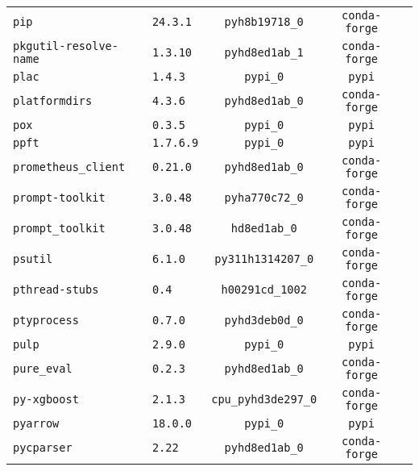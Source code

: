 \begin{longtable}{p{}|l|ccc}
\texttt{pip}                       & \texttt{24.3.1}             & \texttt{pyh8b19718\_0}    & \texttt{conda-forge}\\
\texttt{pkgutil-resolve-name}      & \texttt{1.3.10}             & \texttt{pyhd8ed1ab\_1}    & \texttt{conda-forge}\\
\texttt{plac}                      & \texttt{1.4.3}              & \texttt{pypi\_0}          & \texttt{pypi}\\
\texttt{platformdirs}              & \texttt{4.3.6}              & \texttt{pyhd8ed1ab\_0}    & \texttt{conda-forge}\\
\texttt{pox}                       & \texttt{0.3.5}              & \texttt{pypi\_0}          & \texttt{pypi}\\
\texttt{ppft}                      & \texttt{1.7.6.9}            & \texttt{pypi\_0}          & \texttt{pypi}\\
\texttt{prometheus\_client}         & \texttt{0.21.0}             & \texttt{pyhd8ed1ab\_0}    & \texttt{conda-forge}\\
\texttt{prompt-toolkit}            & \texttt{3.0.48}             & \texttt{pyha770c72\_0}    & \texttt{conda-forge}\\
\texttt{prompt\_toolkit}           & \texttt{3.0.48}             & \texttt{hd8ed1ab\_0}      & \texttt{conda-forge}\\
\texttt{psutil}                    & \texttt{6.1.0}              & \texttt{py311h1314207\_0} & \texttt{conda-forge}\\
\texttt{pthread-stubs}             & \texttt{0.4}                & \texttt{h00291cd\_1002}   & \texttt{conda-forge}\\
\texttt{ptyprocess}                & \texttt{0.7.0}              & \texttt{pyhd3deb0d\_0}    & \texttt{conda-forge}\\
\texttt{pulp}                      & \texttt{2.9.0}              & \texttt{pypi\_0}          & \texttt{pypi}\\
\texttt{pure\_eval}                & \texttt{0.2.3}              & \texttt{pyhd8ed1ab\_0}    & \texttt{conda-forge}\\
\texttt{py-xgboost}                & \texttt{2.1.3}             & \texttt{cpu\_pyhd3de297\_0} & \texttt{conda-forge}\\
\texttt{pyarrow}                   & \texttt{18.0.0}             & \texttt{pypi\_0}          & \texttt{pypi}\\
\texttt{pycparser}                 & \texttt{2.22}               & \texttt{pyhd8ed1ab\_0}    & \texttt{conda-forge}\\

\end{longtable}
